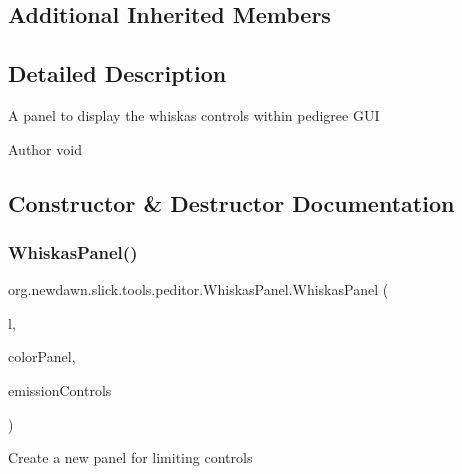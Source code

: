 \subsection*{Additional Inherited Members}


\subsection{Detailed Description}
A panel to display the whiskas controls within pedigree G\+UI

\begin{DoxyAuthor}{Author}
void 
\end{DoxyAuthor}


\subsection{Constructor \& Destructor Documentation}
\mbox{\label{classorg_1_1newdawn_1_1slick_1_1tools_1_1peditor_1_1_whiskas_panel_a4cf87fd77fc80f3c26254fd53ebc94af}} 
\subsubsection{\texorpdfstring{Whiskas\+Panel()}{WhiskasPanel()}}
{\footnotesize\ttfamily org.\+newdawn.\+slick.\+tools.\+peditor.\+Whiskas\+Panel.\+Whiskas\+Panel (\begin{DoxyParamCaption}\item[{\mbox{\hyperlink{classorg_1_1newdawn_1_1slick_1_1tools_1_1peditor_1_1_emitter_list}{Emitter\+List}}}]{l,  }\item[{final \mbox{\hyperlink{classorg_1_1newdawn_1_1slick_1_1tools_1_1peditor_1_1_color_panel}{Color\+Panel}}}]{color\+Panel,  }\item[{final \mbox{\hyperlink{classorg_1_1newdawn_1_1slick_1_1tools_1_1peditor_1_1_emission_controls}{Emission\+Controls}}}]{emission\+Controls }\end{DoxyParamCaption})\hspace{0.3cm}{\ttfamily [inline]}}

Create a new panel for limiting controls


